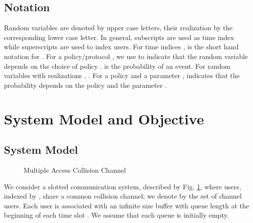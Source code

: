 \documentclass[onecolumn,draftcls]{IEEEtran}
\begin{document}
\subsection*{Notation}
Random variables are denoted by upper case letters, their realization by the corresponding lower case letter.
In general, subscripts are used as time index while superscripts are used to index users. 
For time indices ,  is the short hand notation for .
For a policy/protocol , we use  to indicate that the random variable  depends on the choice of policy .
 is the probability of an event. For random variables  with realizations , .
For a policy  and a parameter ,  indicates that the probability depends on the policy  and the parameter .




\section{System Model and Objective}
\label{sec:model}
\subsection{System Model}
\label{sub:model}
\begin{figure}
\begin{center}

\end{center}

\caption{Multiple Access Collision Channel}
\label{fig:system}
\end{figure}
We consider a slotted communication system, described by Fig. \ref{fig:system}, 
where  users, indexed by , 
share a common collision channel; we denote by  the set of channel users.
Each user  is associated with an infinite size buffer
with queue length  at the beginning of each time slot .
We assume that each queue is initially empty.
\end{document}
